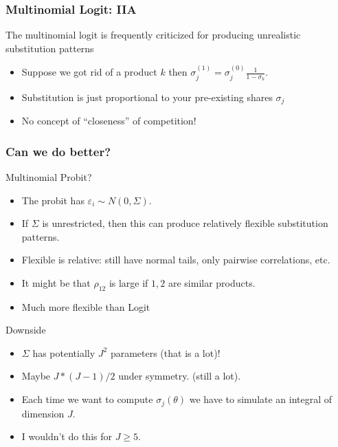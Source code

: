 \documentclass[aspectratio=169,11pt]{beamer}
\begin{document}
\begin{frame}
\frametitle{Multinomial Logit: IIA}
The multinomial logit is frequently criticized for producing unrealistic substitution patterns
\begin{itemize}
\item Suppose we got rid of a product $k$ then $\sigma_j^{(1)} = \sigma_j^{(0)} \frac{1}{1- \sigma_k}$.
\item Substitution is just proportional to your pre-existing shares $\sigma_j$
\item No concept of ``closeness'' of competition!
\end{itemize}
\end{frame}

\begin{frame}
\frametitle{Can we do better?}
Multinomial Probit?
\begin{itemize}
\item The probit has $\varepsilon_i \sim N(0,\Sigma)$.
\item If $\Sigma$ is unrestricted, then this can produce relatively flexible substitution patterns.
\item Flexible is relative: still have normal tails, only pairwise correlations, etc.
\item It might be that $\rho_{12}$ is large if $1,2$ are similar products.
\item Much more flexible than Logit
\end{itemize}
Downside
\begin{itemize}
\item $\Sigma$ has potentially $J^2$ parameters (that is a lot)!
\item Maybe $J * (J-1)/2$ under symmetry. (still a lot).
\item Each time we want to compute $\sigma_j(\theta)$ we have to simulate an integral of dimension $J$.
\item I wouldn't do this for $J \geq 5$.
\end{itemize}
\end{frame}
\end{document}
